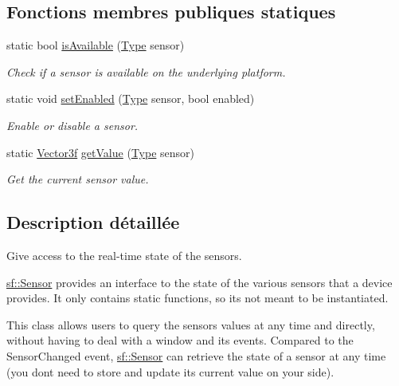 \subsection*{Fonctions membres publiques statiques}
\begin{DoxyCompactItemize}
\item 
static bool \hyperlink{classsf_1_1Sensor_a7b7a2570218221781233bd495323abf0}{is\+Available} (\hyperlink{classsf_1_1Sensor_a687375af3ab77b818fca73735bcaea84}{Type} sensor)
\begin{DoxyCompactList}\small\item\em Check if a sensor is available on the underlying platform. \end{DoxyCompactList}\item 
static void \hyperlink{classsf_1_1Sensor_afb31c5697d2e0a5fec70d702ec1d6cd9}{set\+Enabled} (\hyperlink{classsf_1_1Sensor_a687375af3ab77b818fca73735bcaea84}{Type} sensor, bool enabled)
\begin{DoxyCompactList}\small\item\em Enable or disable a sensor. \end{DoxyCompactList}\item 
static \hyperlink{classsf_1_1Vector3}{Vector3f} \hyperlink{classsf_1_1Sensor_ab9a2710f55ead2f7b4e1b0bead34457e}{get\+Value} (\hyperlink{classsf_1_1Sensor_a687375af3ab77b818fca73735bcaea84}{Type} sensor)
\begin{DoxyCompactList}\small\item\em Get the current sensor value. \end{DoxyCompactList}\end{DoxyCompactItemize}


\subsection{Description détaillée}
Give access to the real-\/time state of the sensors. 

\hyperlink{classsf_1_1Sensor}{sf\+::\+Sensor} provides an interface to the state of the various sensors that a device provides. It only contains static functions, so it\textquotesingle{}s not meant to be instantiated.

This class allows users to query the sensors values at any time and directly, without having to deal with a window and its events. Compared to the Sensor\+Changed event, \hyperlink{classsf_1_1Sensor}{sf\+::\+Sensor} can retrieve the state of a sensor at any time (you don\textquotesingle{}t need to store and update its current value on your side).

